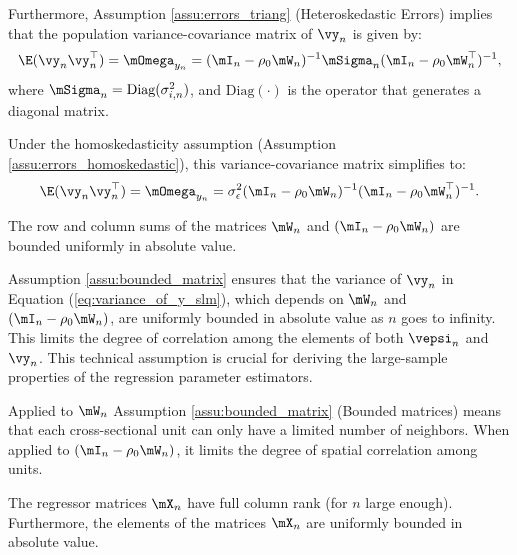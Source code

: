 \documentclass[english,12pt]{book}\usepackage[]{graphicx}\usepackage[]{xcolor}
\begin{document}
Furthermore, Assumption \ref{assu:errors_triang} (Heteroskedastic Errors) implies that the population variance-covariance matrix of $\vy_n$ is given by:
\begin{equation}\label{eq:variance_of_y_slm}
  \E(\vy_n\vy^\top_n) = \mOmega_{y_n}= (\mI_n - \rho_0\mW_n)^{-1}\mSigma_n(\mI_n - \rho_0\mW^\top_n)^{-1},
\end{equation}
%
where $\mSigma_n = \textrm{Diag}(\sigma^2_{i, n})$, and $\textrm{Diag}(\cdot)$ is the operator that generates a diagonal matrix. 

Under the homoskedasticity assumption (Assumption \ref{assu:errors_homoskedastic}), this variance-covariance matrix simplifies to:
\begin{equation}\label{eq:variance_of_y_slm-homo}
  \E(\vy_n\vy^\top_n) = \mOmega_{y_n} = \sigma^2_{\epsilon}(\mI_n - \rho_0\mW_n)^{-1}(\mI_n - \rho_0\mW^\top_n)^{-1}.
\end{equation}

\begin{assumption}\label{assu:bounded_matrix}
The row and column sums of the matrices $\mW_n$ and $(\mI_n - \rho_0\mW_n)$ are bounded uniformly in absolute value.
\end{assumption}


Assumption \ref{assu:bounded_matrix} ensures that the variance of $\vy_n$  in Equation (\ref{eq:variance_of_y_slm}), which depends on $\mW_n$ and $(\mI_n - \rho_0\mW_n)$, are uniformly bounded in absolute value as $n$ goes to infinity.  This limits the degree of correlation among the elements of both $\vepsi_n$ and $\vy_n$. This technical assumption is crucial for deriving the large-sample properties of the regression parameter estimators. 

\begin{remark}
Applied to $\mW_n$ Assumption \ref{assu:bounded_matrix} (Bounded matrices) means that each cross-sectional unit can only have a limited number of neighbors. When applied to $\left(\mI_n - \rho _0\mW_n\right)$, it limits the degree of spatial correlation among units. 
\end{remark}

\begin{assumption}\label{assu:regressors}
The regressor matrices $\mX_n$ have full column rank (for $n$ large enough). Furthermore, the elements of the matrices $\mX_n$ are uniformly bounded in absolute value.
\end{assumption}
\end{document}
